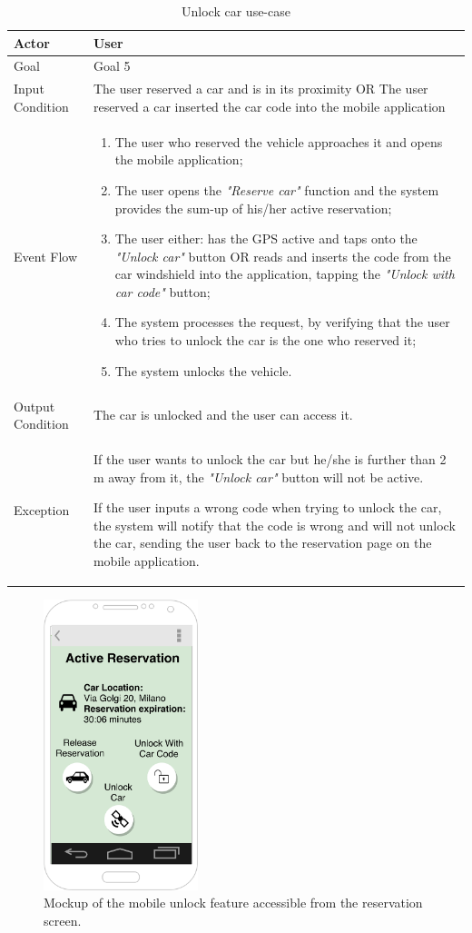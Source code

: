 \begin{table}[H]
\begin{center}
\begin{tabular}{p{} | p{}}
\hline
Actor & User\\
\hline
Goal & Goal 5\\
\hline
Input Condition & The user reserved a car and is in its proximity OR The user reserved a car inserted the car code into the mobile application\\
\hline
Event Flow & 
\begin{enumerate}
\item The user who reserved the vehicle approaches it and opens the mobile application;
\item The user opens the \emph{"Reserve car"} function and the system provides the sum-up of his/her active reservation;
\item The user either: has the GPS active and taps onto the \emph{"Unlock car"} button OR reads and inserts the code from the car windshield into the application, tapping the \emph{"Unlock with car code"} button;
\item The system processes the request, by verifying that the user who tries to unlock the car is the one who reserved it;
\item The system unlocks the vehicle.
\end{enumerate} \\
\hline
Output Condition & The car is unlocked and the user can access it.\\
\hline
Exception & If the user wants to unlock the car but he/she is further than 2 m away from it, the \emph{"Unlock car"} button will not be active.

If the user inputs a wrong code when trying to unlock the car, the system will notify that the code is wrong and will not unlock the car, sending the user back to the reservation page on the mobile application.\\
\hline
\end{tabular}
\end{center}
\caption{Unlock car use-case}
\label{unlock_car_uc}
\end{table}

\begin{figure}[H]
\begin{center}
		\includegraphics[width=0.4\textwidth]{./specific_requirements/features/diagrams/mobile_unlock.png}
		\caption{Mockup of the mobile unlock feature accessible from the reservation screen.}
		\label{mobile_unlock}
\end{center}
\end{figure}